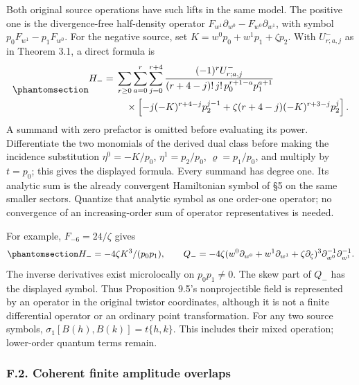 \documentclass[
  english,
  11pt,
  reqno]{amsart}
\begin{document}
Both original source operations have such lifts in the same model. The
positive one is the divergence-free half-density operator
\(F_{w^1}\partial_{w^0}-F_{w^0}\partial_{w^1}\), with symbol
\(p_0F_{w^1}-p_1F_{w^0}\). For the negative source, set
\(K=w^0p_0+w^1p_1+\zeta p_2\). With \(U^-_{r;a,j}\) as in Theorem 3.1, a
direct formula is
\begin{equation}\protect\phantomsection\label{eq:gg-op-general-negative}{
 \begin{aligned}
 H_-={}&\sum_{r\ge0}\sum_{a=0}^r\sum_{j=0}^{r+4}
 \frac{(-1)^rU^-_{r;a,j}}
 {(r+4-j)!\,j!\,p_0^{r+1-a}p_1^{a+1}}\\
 &\quad{}\times
 \left[-j(-K)^{r+4-j}p_2^{j-1}
       +\zeta(r+4-j)(-K)^{r+3-j}p_2^j\right].
 \end{aligned}
}\end{equation} A summand with zero prefactor is omitted before
evaluating its power. Differentiate the two monomials of the derived
dual class before making the incidence substitution \(\eta^0=-K/p_0\),
\(\eta^1=p_2/p_0\), \(\varrho=p_1/p_0\), and multiply by \(t=p_0\); this
gives the displayed formula. Every summand has degree one. Its analytic
sum is the already convergent Hamiltonian symbol of §5 on the same
smaller sectors. Quantize that analytic symbol as one order-one
operator; no convergence of an increasing-order sum of operator
representatives is needed.

For example, \(F_{-6}=24/\zeta\) gives
\begin{equation}\protect\phantomsection\label{eq:gg-op-negative-example}{
 H_-=-4\zeta K^3/(p_0p_1),\qquad
 Q_-=-4\zeta
 (w^0\partial_{w^0}+w^1\partial_{w^1}
                         +\zeta\partial_\zeta)^3
 \partial_{w^0}^{-1}\partial_{w^1}^{-1}.
}\end{equation} The inverse derivatives exist microlocally on
\(p_0p_1\ne0\). The skew part of \(Q_-\) has the displayed symbol. Thus
Proposition 9.5's nonprojectible field is represented by an operator in
the original twistor coordinates, although it is not a finite
differential operator or an ordinary point transformation. For any two
source symbols, \(\sigma_1[B(h),B(k)]=t\{h,k\}\). This includes their
mixed operation; lower-order quantum terms remain.

\protect{}\label{sec:gg-op-finite-descent}

\subsubsection{F.2. Coherent finite amplitude
overlaps}\label{f.2.-coherent-finite-amplitude-overlaps}
\end{document}
